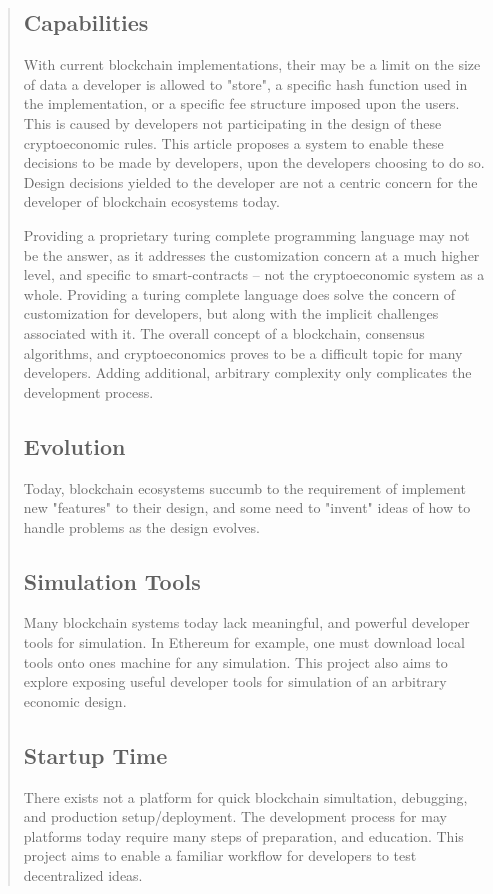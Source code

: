 \documentclass[12pt, titlepage, twocolumn]{report}
\begin{document}
\begin{quotation}
\subsection{Capabilities}
With current blockchain implementations, their may be a limit on the size of data a developer is allowed to "store", a specific hash function used in the implementation, or a specific fee structure imposed upon the users. This is caused by developers not participating in the design of these cryptoeconomic rules. This article proposes a system to enable these decisions to be made by developers, upon the developers choosing to do so. Design decisions yielded to the developer are not a centric concern for the developer of blockchain ecosystems today. 

Providing a proprietary turing complete programming language may not be the answer, as it addresses the customization concern at a much higher level, and specific to smart-contracts -- not the cryptoeconomic system as a whole. Providing a turing complete language does solve the concern of customization for developers, but along with the implicit challenges associated with it. The overall concept of a blockchain, consensus algorithms, and cryptoeconomics proves to be a difficult topic for many developers. Adding additional, arbitrary complexity only complicates the development process.   

\subsection{Evolution}
Today, blockchain ecosystems succumb to the requirement of implement new "features" to their design, and some need to "invent" ideas of how to handle problems as the design evolves. 

\subsection{Simulation Tools}
Many blockchain systems today lack meaningful, and powerful developer tools for simulation. In Ethereum for example, one must download local tools onto ones machine for any simulation. This project also aims to explore exposing useful developer tools for simulation of an arbitrary economic design.


\subsection{Startup Time}
There exists not a platform for quick blockchain simultation, debugging, and production setup/deployment. The development process for may platforms today require many steps of preparation, and education. This project aims to enable a familiar workflow for developers to test decentralized ideas.



\end{quotation}
\end{document}
